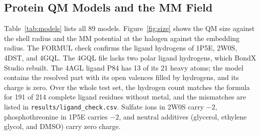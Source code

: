 \documentclass[journal=jcisd8,manuscript=suppinfo]{achemso}
\newcommand{\BX}{BondX Studio}
\begin{document}
\begin{singlespace}
\section{Protein QM Models and the MM Field}
\label{sec:models}

Table~\ref{tab:models} lists all 89 models. Figure~\ref{fig:size} shows the QM size against the shell radius and the MM potential at the halogen against the embedding radius. The FORMUL check confirms the ligand hydrogens of 1P5E, 2W0S, 4DST, and 4GQL. The 4GQL file lacks two polar ligand hydrogens, which \BX{} rebuilt. The 4AGL ligand P84 has 13 of its 21 heavy atoms; the model contains the resolved part with its open valences filled by hydrogens, and its charge is zero. Over the whole test set, the hydrogen count matches the formula for 191 of 214 complete ligand residues without metal, and the mismatches are listed in \texttt{results/ligand\_check.csv}. Sulfate ions in 2W0S carry $-2$, phosphothreonine in 1P5E carries $-2$, and neutral additives (glycerol, ethylene glycol, and DMSO) carry zero charge.


\end{singlespace}
\end{document}
